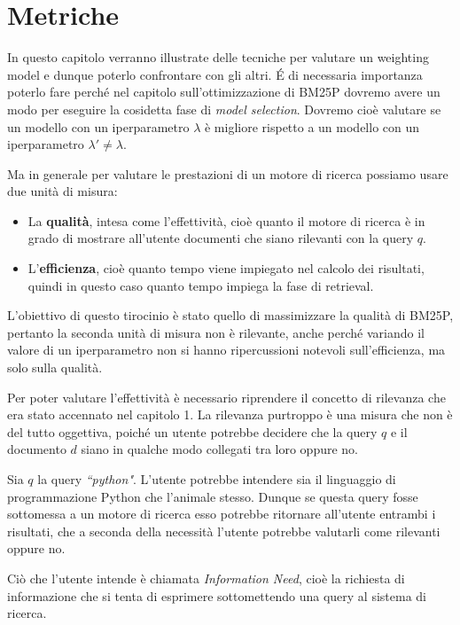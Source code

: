 \chapter{Metriche}

In questo capitolo verranno illustrate delle tecniche 
per valutare un weighting model e dunque poterlo confrontare con gli altri.
\'E di necessaria importanza poterlo fare perché nel capitolo sull'ottimizzazione di BM25P dovremo avere un modo per eseguire
la cosidetta fase di \textit{model selection}. Dovremo cioè valutare se un modello con un iperparametro $\lambda$ è
migliore rispetto a un modello con un iperparametro $\lambda' \neq \lambda$.

Ma in generale per valutare le prestazioni di un motore di ricerca possiamo usare due unità di misura:

\begin{itemize}
	\item La \textbf{qualità}, intesa come l'effettività, cioè quanto il motore di ricerca
	è in grado di mostrare all'utente documenti che siano rilevanti con la query $q$.
	\item L'\textbf{efficienza}, cioè quanto tempo viene impiegato nel calcolo dei risultati, quindi in questo caso
	quanto tempo impiega la fase di retrieval.
\end{itemize}

L'obiettivo di questo tirocinio è stato quello di massimizzare la qualità di BM25P, pertanto
la seconda unità di misura non è rilevante, anche perché variando il valore di un iperparametro
non si hanno ripercussioni notevoli sull'efficienza, ma solo sulla qualità.

Per poter valutare l'effettività è necessario riprendere il concetto di rilevanza  che era stato
accennato nel capitolo 1. La rilevanza purtroppo è una misura che non è del tutto oggettiva,
poiché un utente potrebbe decidere che la query $q$ e il documento $d$ siano
in qualche modo collegati tra loro oppure no.

\begin{esempio}
	Sia $q$ la query \textit{``python"}. L'utente potrebbe intendere sia il linguaggio di programmazione Python
	che l'animale stesso. Dunque se questa query fosse sottomessa a un motore di ricerca
	esso potrebbe ritornare all'utente entrambi i risultati, che a seconda della necessità
	l'utente potrebbe valutarli come rilevanti oppure no.
\end{esempio}

Ciò che l'utente intende è chiamata \textit{Information Need}, cioè la richiesta di informazione
che si tenta di esprimere sottomettendo una query al sistema di ricerca.

